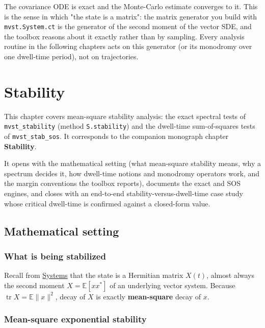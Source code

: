 \documentclass[11pt,oneside]{report}
\newcommand{\code}[1]{\texttt{#1}}
\begin{document}
The covariance ODE is exact and the Monte-Carlo estimate converges to it. This
is the sense in which "the state is a matrix": the matrix generator you build
with \code{mvst.System.ct} is the generator of the second moment of the vector SDE,
and the toolbox reasons about it exactly rather than by sampling. Every analysis
routine in the following chapters acts on this generator (or its monodromy over
one dwell-time period), not on trajectories.


\hypertarget{chap:03-stability}{%
\chapter{Stability}\label{chap:03-stability}}

This chapter covers mean-square stability analysis: the exact spectral tests of
\code{mvst\_stability} (method \code{S.stability}) and the dwell-time sum-of-squares tests
of \code{mvst\_stab\_sos}. It corresponds to the companion monograph chapter
\textbf{Stability}.

It opens with the mathematical setting (what mean-square stability means, why a
spectrum decides it, how dwell-time notions and monodromy operators work, and
the margin conventions the toolbox reports), documents the exact and SOS
engines, and closes with an end-to-end stability-versus-dwell-time case study whose
critical dwell-time is confirmed against a closed-form value.

\hypertarget{mathematical-setting}{%
\section{Mathematical setting}\label{mathematical-setting}}

\hypertarget{what-is-being-stabilized}{%
\subsection{What is being stabilized}\label{what-is-being-stabilized}}

Recall from \protect\hyperlink{chap:02-systems}{Systems} that the state is a Hermitian matrix
\(X(t)\), almost always the second moment \(X=\mathbb{E}[x x^{*}]\) of an underlying
vector system. Because \(\operatorname{tr}X=\mathbb{E}\|x\|^{2}\), decay of \(X\) is
exactly \textbf{mean-square} decay of \(x\).

\hypertarget{mean-square-exponential-stability}{%
\subsection{Mean-square exponential stability}\label{mean-square-exponential-stability}}
\end{document}

